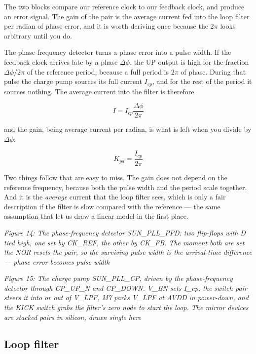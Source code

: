 The two blocks compare our reference clock to our feedback clock, and
produce an error signal. The gain of the pair is the average current fed
into the loop filter per radian of phase error, and it is worth deriving
once because the \(2\pi\) looks arbitrary until you do.

The phase-frequency detector turns a phase error into a pulse width. If
the feedback clock arrives late by a phase \(\Delta\phi\), the UP output
is high for the fraction \(\Delta\phi/2\pi\) of the reference period,
because a full period is \(2\pi\) of phase. During that pulse the charge
pump sources its full current \(I_{cp}\), and for the rest of the period
it sources nothing. The average current into the filter is therefore

\[ \overline{I} = I_{cp}\frac{\Delta\phi}{2\pi} \]

and the gain, being average current per radian, is what is left when you
divide by \(\Delta\phi\):

\[ K_{pd} = \frac{I_{cp}}{2 \pi} \]

Two things follow that are easy to miss. The gain does not depend on the
reference frequency, because both the pulse width and the period scale
together. And it is the \emph{average} current that the loop filter
sees, which is only a fair description if the filter is slow compared
with the reference --- the same assumption that let us draw a linear
model in the first place.


{
\centering
{}
}

\emph{Figure 14: The phase-frequency detector SUN\_PLL\_PFD: two
flip-flops with D tied high, one set by CK\_REF, the other by CK\_FB.
The moment both are set the NOR resets the pair, so the surviving pulse
width is the arrival-time difference --- phase error becomes pulse
width}


{
\centering
{}
}

\emph{Figure 15: The charge pump SUN\_PLL\_CP, driven by the
phase-frequency detector through CP\_UP\_N and CP\_DOWN. V\_BN sets
I\_cp, the switch pair steers it into or out of V\_LPF, M7 parks V\_LPF
at AVDD in power-down, and the KICK switch grabs the filter's zero node
to start the loop. The mirror devices are stacked pairs in silicon,
drawn single here}

\subsection{Loop filter}\label{loop-filter}

